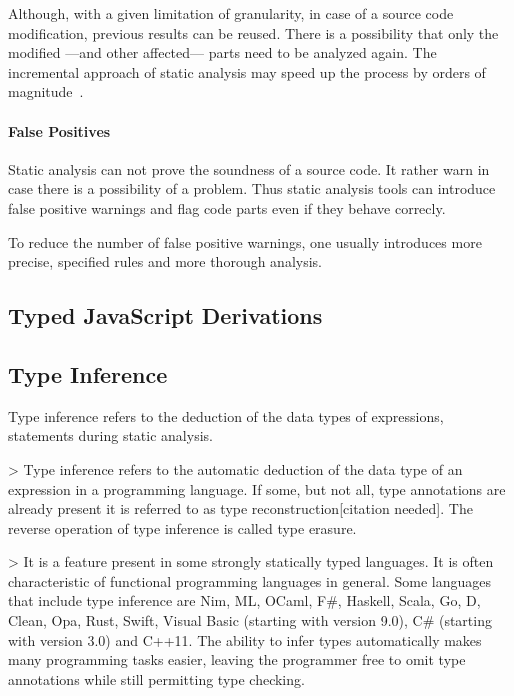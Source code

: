 Although, with a given limitation of granularity, in case of a source code modification, previous results can be reused. There is a possibility that only the modified ---and other affected--- parts need to be analyzed again. The incremental approach of static analysis may speed up the process by orders of magnitude~\cite{stein-daniel-bsc}.

\paragraph{False Positives} Static analysis can not prove the soundness of a source code. It rather warn in case there is a possibility of a problem. Thus static analysis tools can introduce false positive warnings and flag code parts even if they behave correcly.

To reduce the number of false positive warnings, one usually introduces more precise, specified rules and more thorough analysis.

%
%

\subsection{Typed JavaScript Derivations}

\subsection{Type Inference}

Type inference refers to the deduction of the data types of expressions, statements during static analysis.

> Type inference refers to the automatic deduction of the data type of an expression in a programming language. If some, but not all, type annotations are already present it is referred to as type reconstruction[citation needed]. The reverse operation of type inference is called type erasure.

> It is a feature present in some strongly statically typed languages. It is often characteristic of functional programming languages in general. Some languages that include type inference are Nim, ML, OCaml, F\#, Haskell, Scala, Go, D, Clean, Opa, Rust, Swift, Visual Basic (starting with version 9.0), C\# (starting with version 3.0) and C++11. The ability to infer types automatically makes many programming tasks easier, leaving the programmer free to omit type annotations while still permitting type checking.

